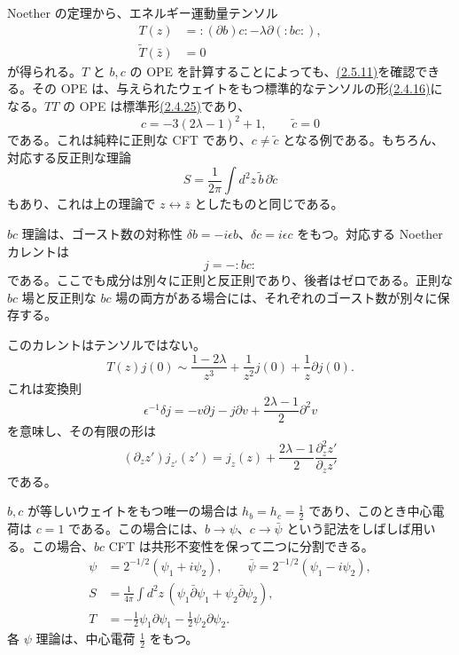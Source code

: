 Noether の定理から、エネルギー運動量テンソル
\begin{align}
T(z)&=:(\partial b)c:-\lambda\partial(:bc:),
\tag{2.5.11a}\label{eq:2.5.11a}\\
\widetilde T(\bar z)&=0
\tag{2.5.11b}\label{eq:2.5.11b}
\end{align}
が得られる。$T$ と $b,c$ の OPE を計算することによっても、\hyperref[eq:2.5.11a]{(2.5.11)}を確認できる。その OPE は、与えられたウェイトをもつ標準的なテンソルの形\hyperref[eq:2.4.16]{(2.4.16)}になる。$TT$ の OPE は標準形\hyperref[eq:2.4.25]{(2.4.25)}であり、
\begin{equation}
c=-3(2\lambda-1)^2+1,\qquad \tilde c=0
\tag{2.5.12}\label{eq:2.5.12}
\end{equation}
である。これは純粋に正則な CFT であり、$c\ne\tilde c$ となる例である。もちろん、対応する反正則な理論
\begin{equation}
S=\frac1{2\pi}\int d^2z\,\tilde b\,\partial\tilde c
\tag{2.5.13}\label{eq:2.5.13}
\end{equation}
もあり、これは上の理論で $z\leftrightarrow\bar z$ としたものと同じである。

$bc$ 理論は、ゴースト数の対称性 $\delta b=-i\epsilon b$、$\delta c=i\epsilon c$ をもつ。対応する Noether カレントは
\begin{equation}
j=-:bc:
\tag{2.5.14}\label{eq:2.5.14}
\end{equation}
である。ここでも成分は別々に正則と反正則であり、後者はゼロである。正則な $bc$ 場と反正則な $bc$ 場の両方がある場合には、それぞれのゴースト数が別々に保存する。

このカレントはテンソルではない。
\begin{equation}
T(z)j(0)\sim\frac{1-2\lambda}{z^3}
+\frac1{z^2}j(0)+\frac1z\partial j(0).
\tag{2.5.15}\label{eq:2.5.15}
\end{equation}
これは変換則
\begin{equation}
\epsilon^{-1}\delta j=-v\partial j-j\partial v
+\frac{2\lambda-1}{2}\partial^2v
\tag{2.5.16}\label{eq:2.5.16}
\end{equation}
を意味し、その有限の形は
\begin{equation}
(\partial_z z')j_{z'}(z')
=j_z(z)+\frac{2\lambda-1}{2}
\frac{\partial_z^2z'}{\partial_z z'}
\tag{2.5.17}\label{eq:2.5.17}
\end{equation}
である。

$b,c$ が等しいウェイトをもつ唯一の場合は $h_b=h_c=\tfrac12$ であり、このとき中心電荷は $c=1$ である。この場合には、$b\to\psi$、$c\to\bar\psi$ という記法をしばしば用いる。この場合、$bc$ CFT は共形不変性を保って二つに分割できる。
\begin{align}
\psi&=2^{-1/2}(\psi_1+i\psi_2),\qquad
\bar\psi=2^{-1/2}(\psi_1-i\psi_2),
\tag{2.5.18a}\label{eq:2.5.18a}\\
S&=\frac1{4\pi}\int d^2z\,
\left(\psi_1\bar\partial\psi_1+\psi_2\bar\partial\psi_2\right),
\tag{2.5.18b}\label{eq:2.5.18b}\\
T&=-\frac12\psi_1\partial\psi_1-\frac12\psi_2\partial\psi_2.
\tag{2.5.18c}\label{eq:2.5.18c}
\end{align}
各 $\psi$ 理論は、中心電荷 $\tfrac12$ をもつ。

